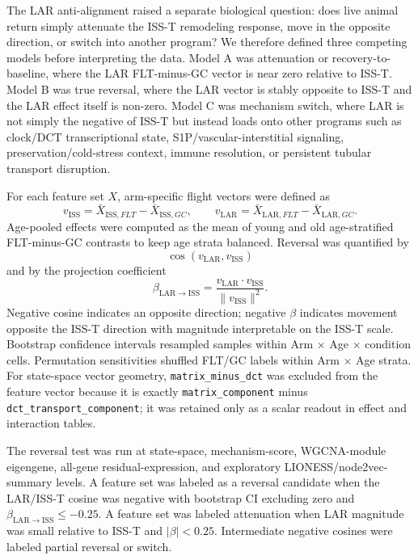 \documentclass[11pt]{article}
\newcommand{\code}[1]{\texttt{#1}}
\begin{document}
The LAR anti-alignment raised a separate biological question: does live animal return simply attenuate the ISS-T remodeling response, move in the opposite direction, or switch into another program? We therefore defined three competing models before interpreting the data. Model A was attenuation or recovery-to-baseline, where the LAR FLT-minus-GC vector is near zero relative to ISS-T. Model B was true reversal, where the LAR vector is stably opposite to ISS-T and the LAR effect itself is non-zero. Model C was mechanism switch, where LAR is not simply the negative of ISS-T but instead loads onto other programs such as clock/DCT transcriptional state, S1P/vascular-interstitial signaling, preservation/cold-stress context, immune resolution, or persistent tubular transport disruption.

For each feature set $X$, arm-specific flight vectors were defined as
\begin{equation}
v_{\mathrm{ISS}}=\bar{X}_{\mathrm{ISS},FLT}-\bar{X}_{\mathrm{ISS},GC},
\qquad
v_{\mathrm{LAR}}=\bar{X}_{\mathrm{LAR},FLT}-\bar{X}_{\mathrm{LAR},GC}.
\end{equation}
Age-pooled effects were computed as the mean of young and old age-stratified FLT-minus-GC contrasts to keep age strata balanced. Reversal was quantified by
\begin{equation}
\cos(v_{\mathrm{LAR}},v_{\mathrm{ISS}})
\end{equation}
and by the projection coefficient
\begin{equation}
\beta_{\mathrm{LAR}\rightarrow \mathrm{ISS}}
=\frac{v_{\mathrm{LAR}}\cdot v_{\mathrm{ISS}}}{\lVert v_{\mathrm{ISS}}\rVert^2}.
\end{equation}
Negative cosine indicates an opposite direction; negative $\beta$ indicates movement opposite the ISS-T direction with magnitude interpretable on the ISS-T scale. Bootstrap confidence intervals resampled samples within Arm $\times$ Age $\times$ condition cells. Permutation sensitivities shuffled FLT/GC labels within Arm $\times$ Age strata. For state-space vector geometry, \code{matrix\_minus\_dct} was excluded from the feature vector because it is exactly \code{matrix\_component} minus \code{dct\_transport\_component}; it was retained only as a scalar readout in effect and interaction tables.

The reversal test was run at state-space, mechanism-score, WGCNA-module eigengene, all-gene residual-expression, and exploratory LIONESS/node2vec-summary levels. A feature set was labeled as a reversal candidate when the LAR/ISS-T cosine was negative with bootstrap CI excluding zero and $\beta_{\mathrm{LAR}\rightarrow \mathrm{ISS}}\leq -0.25$. A feature set was labeled attenuation when LAR magnitude was small relative to ISS-T and $|\beta|<0.25$. Intermediate negative cosines were labeled partial reversal or switch.
\end{document}
